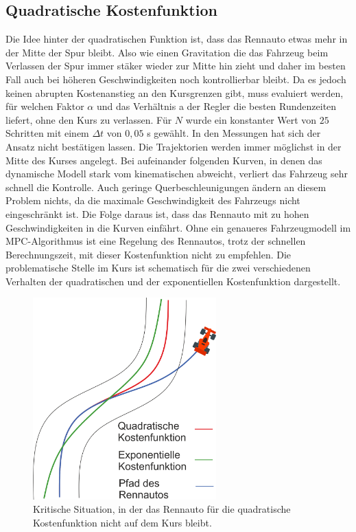 \documentclass{like}
\begin{document}
\subsection{Quadratische Kostenfunktion}
Die Idee hinter der quadratischen Funktion ist, dass das Rennauto etwas mehr in der Mitte der Spur bleibt. Also wie einen Gravitation die das Fahrzeug beim Verlassen der Spur immer stäker wieder zur Mitte hin zieht und daher im besten Fall auch bei höheren Geschwindigkeiten noch kontrollierbar bleibt. Da es jedoch keinen abrupten Kostenanstieg an den Kursgrenzen gibt, muss evaluiert werden, für welchen Faktor $\alpha$ und das Verhältnis a der Regler die besten Rundenzeiten liefert, ohne den Kurs zu verlassen. Für $N$ wurde ein konstanter Wert von $25$ Schritten mit einem $\Delta t$ von $0,05$ s gewählt. In den Messungen hat sich der Ansatz nicht bestätigen lassen. Die Trajektorien werden immer möglichst in der Mitte des Kurses angelegt. Bei aufeinander folgenden Kurven, in denen das dynamische Modell stark vom kinematischen abweicht, verliert das Fahrzeug sehr schnell die Kontrolle. Auch geringe Querbeschleunigungen ändern an diesem Problem nichts, da die maximale Geschwindigkeit des Fahrzeugs nicht eingeschränkt ist. Die Folge daraus ist, dass das Rennauto mit zu hohen Geschwindigkeiten in die Kurven einfährt. Ohne ein genaueres Fahrzeugmodell im \ac{MPC}-Algorithmus ist eine Regelung des Rennautos, trotz der schnellen Berechnungszeit, mit dieser Kostenfunktion nicht zu empfehlen.
Die problematische Stelle im Kurs ist schematisch für die zwei verschiedenen Verhalten der quadratischen und der exponentiellen Kostenfunktion dargestellt. 

\begin{figure}[ht!]
	\centering
	\includegraphics[width=200pt]{Abbildungen/quadraticCostFunction.png}
	\caption{Kritische Situation, in der das Rennauto für die quadratische Kostenfunktion nicht auf dem Kurs bleibt.}
	\label{fig:quadraticCostFunct}
\end{figure}
\end{document}
